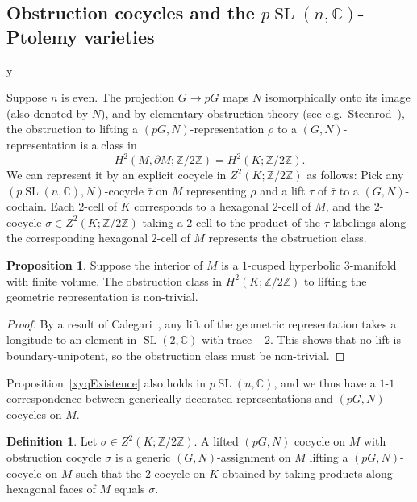 \documentclass[11pt]{amsart}
\theoremstyle{definition}
\newtheorem{proposition}[theorem]{Proposition}
\newtheorem{definition}[theorem]{Definition}
\numberwithin{equation}{section}
\def\printname#1{
        \if\draft y
                \smash{\makebox[0pt]{\hspace{-0.5in}
                        \raisebox{8pt}{\tt\tiny #1}}}
        \fi
}
\def\lbl#1{\label{#1}\printname{#1}}
\DeclareMathOperator{\SL}{SL}
\newcommand{\C}{\mathbb C}
\newcommand{\Z}{\mathbb Z}
\begin{document}
\subsection{Obstruction cocycles and the $p\SL(n,\C)$-Ptolemy varieties}
\lbl{sub.obstruction}
Suppose $n$ is even. The projection $G\to pG$ maps $N$ isomorphically onto its image (also denoted by $N$), and by elementary obstruction theory (see e.g.~Steenrod~\cite{Steenrod}), the obstruction to lifting a $(pG,N)$-representation $\rho$ to a $(G,N)$-representation is a class in 
\begin{equation}
H^2(M,\partial M;\Z/2\Z)=H^2(K;\Z/2\Z).
\end{equation} 
We can represent it by an explicit cocycle in $Z^2(K;\Z/2\Z)$ as follows: Pick any $(p\SL(n,\C),N)$-cocycle $\bar\tau$ on $M$ representing $\rho$ and a lift $\tau$ of $\bar\tau$ to a $(G,N)$-cochain. Each $2$-cell of $K$ corresponds to a hexagonal $2$-cell of $M$, and the $2$-cocycle $\sigma\in Z^2(K;\Z/2\Z)$ taking a $2$-cell to the product of the $\tau$-labelings along the corresponding hexagonal $2$-cell of $M$ represents the obstruction class. %

\begin{proposition} 
Suppose the interior of $M$ is a $1$-cusped hyperbolic $3$-manifold with finite volume. The obstruction class in $H^2(K;\Z/2\Z)$ to lifting the geometric representation is non-trivial.
\end{proposition}

\begin{proof} 
By a result of Calegari~\cite[Corollary~2.4]{Calegari}, any lift of the geometric representation takes a longitude to an element in $\SL(2,\C)$ with trace $-2$. This shows that no lift is boundary-unipotent, so the obstruction class must be non-trivial.
\end{proof}

Proposition~\ref{xyqExistence} also holds in $p\SL(n,\C)$, and we thus have a $1$-$1$ correspondence between generically decorated representations and $(pG,N)$-cocycles on $M$.

\begin{definition} 
Let $\sigma\in Z^2(K;\Z/2\Z)$. A lifted $(pG,N)$ cocycle on $M$ with obstruction cocycle $\sigma$ is a generic $(G,N)$-assignment on $M$ lifting a $(pG,N)$-cocycle on $M$ such that the 2-cocycle on $K$ obtained by taking products along hexagonal faces of $M$ equals $\sigma$.
\end{definition}
\end{document}
